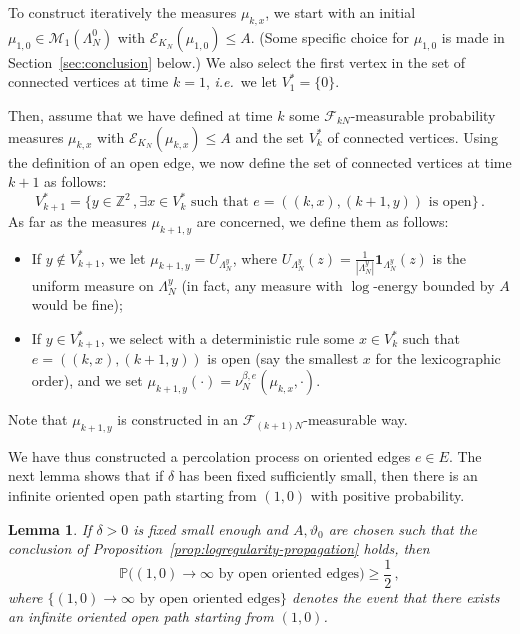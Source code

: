 \documentclass[11pt]{amsart}
\numberwithin{equation}{section}
\newcommand*{\ind}{\mathbf{1}}
\newcommand*{\numberset}{\mathbb}
\newcommand*{\Z}{\numberset{Z}}
\theoremstyle{plain}
\newtheorem{lemma}[theorem]{Lemma}
\theoremstyle{definition}
\theoremstyle{remark}
\begin{document}
To construct iteratively the measures \(\mu_{k,x}\), we start with an initial \(\mu_{1,0} \in \mathcal{M}_1(\Lambda_N^0)\) with \(\mathcal{E}_{K_N}(\mu_{1,0}) \leq A\).
(Some specific choice for \(\mu_{1,0}\) is made in Section~\ref{sec:conclusion} below.)
We also select the first vertex in the set of connected vertices at time \(k=1\), \textit{i.e.}\ we let \(V_1^*=\{0\}\).

Then, assume that we have defined at time \(k\) some $\mathcal F_{kN}$-measurable probability measures $\mu_{k,x}$ with \(\mathcal{E}_{K_N}(\mu_{k,x})\leq A\) and the set \(V_k^*\) of connected vertices.
Using the definition of an open edge, we now define the set of connected vertices at time \(k+1\) as follows:
\[
V_{k+1}^* = \big\{ y \in \Z^2 \,, \exists x \in V_k^* \text{ such that $e = ((k,x),(k+1,y))$ is open} \big\} \,.
\]
As far as the measures \(\mu_{k+1,y}\) are concerned, we define them as follows:
\begin{itemize}
       \item If \(y \notin V_{k+1}^*\), we let \(\mu_{k+1,y} = U_{\Lambda_N^y}\), where \(U_{\Lambda_N^y}(z) = \frac{1}{|\Lambda_N^y|} \ind_{\Lambda_N^y}(z)\) is the uniform measure on \(\Lambda_{N}^y\) (in fact, any measure with \(\log\)-energy bounded by \(A\) would be fine);
       \item If \(y \in V_{k+1}^*\), we select with a deterministic rule some \(x\in V_k^*\) such that $e = ((k,x),(k+1,y))$ is open (say the smallest \(x\) for the lexicographic order), and we set \(\mu_{k+1,y}(\cdot) = \nu_N^{\beta,e}(\mu_{k,x},\cdot)\).
\end{itemize}
Note that \(\mu_{k+1,y}\) is constructed in an \(\mathcal{F}_{(k+1)N}\)-measurable way.

We have thus constructed a percolation process on oriented edges \(e \in E\).
The next lemma shows that if \(\delta\) has been fixed sufficiently small, then there is an infinite oriented open path starting from \((1,0)\) with positive probability. 


\begin{lemma}
       \label{lem:percolation}
       If \(\delta>0\) is fixed small enough and \(A,\vartheta_0\) are chosen such that the conclusion of Proposition~\ref{prop:logregularity-propagation} holds, then
       $$
       \mathbb{P}\big((1,0)\longrightarrow \infty
       \text{ by open oriented edges}\big)\ge \frac12 \, ,
       $$
       where $\{(1,0)\longrightarrow \infty \text{ by open oriented edges}\}$ denotes the event that there exists an infinite oriented open path starting from $(1,0)$.
\end{lemma}
\end{document}
